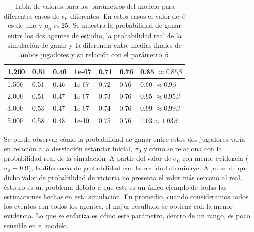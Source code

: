 \documentclass[11pt,twoside,spanish]{report} %
\begin{document}
\begin{table}[H]
{\begin{tabular}{|l|l|l|l|l|l|l|}
1.200                                   & 0.51                                    & 0.46                                     & 1e-07                                  & 0.71                                                 & 0.76                                            & 0.85 $ \approx 0.85\beta$                     \\ \hline
1.500                                   & 0.51                                   & 0.46                                     & 1e-07                                  & 0.72                                                 & 0.76                                            & 0.90 $ \approx 0.9\beta$                      \\ \hline
2.000                                   & 0.51                                    & 0.47                                    & 1e-07                                  & 0.73                                                 & 0.76                                            & 0.95 $ \approx 0.95\beta$                     \\ \hline
3.000                                   & 0.53                                    & 0.47                                     & 1e-07                                  & 0.74                                                 & 0.76                                            & 0.99 $ \approx 0.99\beta$                     \\ \hline
5.000                                   & 0.58                                   & 0.48                                     & 1e-10                                  & 0.75                                                 & 0.76                                            & 1.03$ \approx 1.03\beta$                      \\ \hline
\end{tabular}%
}
\caption{Tabla de valores para los par\'ametros del modelo para diferentes casos de $\sigma_0$ diferentes. En estos casos el valor de $\beta$ es de uno y $\mu_0$ es 25. Se muestra la probabilidad de ganar entre los dos agentes de estudio, la probabilidad real de la simulaci\'on de ganar y la diferencia entre medias finales de ambos jugadores y su relaci\'on con el par\'ametro $\beta$.}
\label{tab:sigma}
\end{table}

%


Se puede observar c\'omo la probabilidad de ganar entre estos dos jugadores var\'ia en relaci\'on a la desviaci\'on est\'andar inicial, $\sigma_0$ y c\'omo se relaciona con la probabilidad real de la simulaci\'on.
A partir del valor de $\sigma_0$ con menor evidencia ($\sigma_0 = 0.9$), la diferencia de probabilidad con la realidad disminuye.
A pesar de que dicho valor de probabilidad de victoria no presenta el valor m\'as cercano al real, \'esto no es un problema debido a que este es un \'unico ejemplo de todas las estimaciones hechas en esta simulaci\'on.
En promedio, cuando consideramos todos los eventos con todos los agentes, el mejor resultado se obtiene con la menor evidencia.
Lo que se enfatiza es c\'omo este par\'ametro, dentro de un rango, es poco sensible en el modelo.
\end{document}
